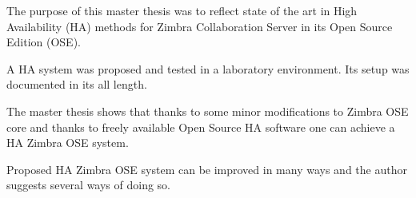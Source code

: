 %
%
%

\noindent       %
The purpose of this master thesis was to reflect state of the art in High Availability (HA) methods for Zimbra Collaboration Server in its Open Source Edition (OSE).

\vspace*{0.5em}
\noindent       %
A HA system was proposed and tested in a laboratory environment. Its setup was documented in its all length.

\vspace*{0.5em}
\noindent       %
The master thesis shows that thanks to some minor modifications to Zimbra OSE core and thanks to freely available Open Source HA software one can achieve a HA Zimbra OSE system.

\vspace*{0.5em}
\noindent       %
Proposed HA Zimbra OSE system can be improved in many ways and the author suggests several ways of doing so.
